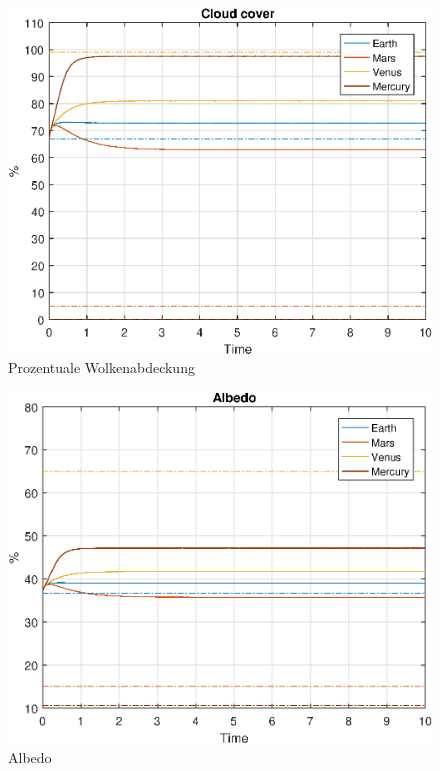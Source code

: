 \begin{refsection}
		\begin{figure}
			\center
			\includegraphics[height=0.45\textheight]{planeten/Matlab/figures/cloudCover.eps}
			\caption{Prozentuale Wolkenabdeckung}
			\label{planeten:figCloudCover}
		\end{figure}
		
		\begin{figure}
			\center
			\includegraphics[height=0.45\textheight]{planeten/Matlab/figures/albedo.eps}
			\caption{Albedo}
			\label{planeten:figAlbedo}
		\end{figure}


\end{refsection}
